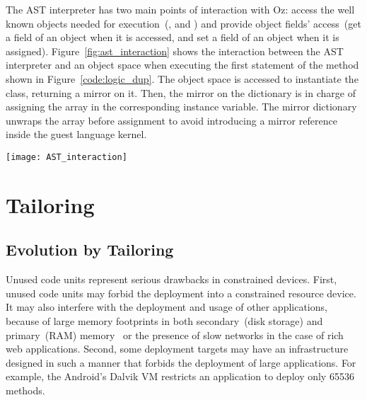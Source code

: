 The AST interpreter has two main points of interaction with Oz: access the well known objects needed for execution~(\ie {},  and ) and provide object fields' access~(\ie get a field of an object when it is accessed, and set a field of an object when it is assigned). Figure~\ref{fig:ast_interaction} shows the interaction between the AST interpreter and an object space when executing the first statement of the  method shown in Figure~\ref{code:logic_dup}. The object space is accessed to instantiate the  class, returning a mirror on it. Then, the mirror on the dictionary is in charge of assigning the array in the corresponding instance variable. The mirror dictionary unwraps the array before assignment to avoid introducing a mirror reference inside the guest language kernel.

\begin{figure*}[ht]
\center
\texttt{[image: AST\_interaction]}
\caption{\textbf{Illustrating the AST interpreter interaction with an object space and mirrors.} \label{fig:ast_interaction}}
\end{figure*}



\section{Tailoring}


\subsection{Evolution by Tailoring} \label{sec:example_intro}

Unused code units represent serious drawbacks in constrained devices. 
First, unused code units may forbid the deployment into a constrained resource device.
It may also interfere with the deployment and usage of other applications, because of large memory footprints in both secondary~(disk storage) and primary~(RAM) memory~\cite{Mart12a} or the presence of slow networks in the case of rich web applications.
Second, some deployment targets may have an infrastructure designed in such a manner that forbids the deployment of large applications. For example, the Android's Dalvik VM restricts an application to deploy only 65536 methods.

